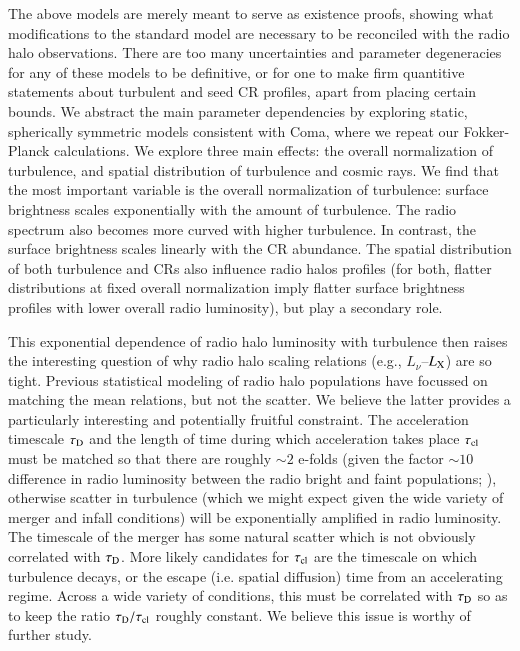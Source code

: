 \documentclass[fleqn,usenatbib,useAMS]{mnras}
\begin{document}
The above models are merely meant to serve as existence proofs, showing what
modifications to the standard model are necessary to be reconciled with the
radio halo observations. There are too many uncertainties and parameter
degeneracies for any of these models to be definitive, or for one to make firm
quantitive statements about turbulent and seed CR profiles, apart from placing
certain bounds. We abstract the main parameter dependencies by exploring static,
spherically symmetric models consistent with Coma, where we repeat our
Fokker-Planck calculations. We explore three main effects: the overall
normalization of turbulence, and spatial distribution of turbulence and cosmic
rays.
We find that the most important variable is the overall normalization of
turbulence: surface brightness scales exponentially with the amount of
turbulence. The radio spectrum also becomes more curved with higher
turbulence. In contrast, the surface brightness scales linearly with the CR
abundance.  The spatial distribution of both turbulence and CRs also influence
radio halos profiles (for both, flatter distributions at fixed overall
normalization imply flatter surface brightness profiles with lower overall radio
luminosity), but play a secondary role.

This exponential dependence of radio halo luminosity with turbulence then raises
the interesting question of why radio halo scaling relations (e.g.,
$L_{\nu}$--$L_{\rm X}$) are so tight. Previous statistical modeling of radio
halo populations \citep{2006MNRAS.369.1577C,2007MNRAS.378.1565C} have focussed
on matching the mean relations, but not the scatter. We believe the latter
provides a particularly interesting and potentially fruitful constraint. The
acceleration timescale $\tau_{\rm D}$ and the length of time during which
acceleration takes place $\tau_{\rm cl}$ must be matched so that there are
roughly $\sim 2$ e-folds (given the factor $\sim 10$ difference in radio
luminosity between the radio bright and faint populations; \citet{brown11}),
otherwise scatter in turbulence (which we might expect given the wide variety of
merger and infall conditions) will be exponentially amplified in radio
luminosity. The timescale of the merger has some natural scatter which is not
obviously correlated with $\tau_{\rm D}$. More likely candidates for $\tau_{\rm
  cl}$ are the timescale on which turbulence decays, or the escape (i.e. spatial
diffusion) time from an accelerating regime. Across a wide variety of
conditions, this must be correlated with $\tau_{\rm D}$ so as to keep the ratio
$\tau_{\rm D}/\tau_{\rm cl}$ roughly constant. We believe this issue is worthy
of further study.
\end{document}
